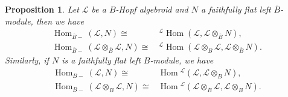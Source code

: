 \documentclass[a4paper,reqno]{amsart}
\DeclareMathOperator{\Hom}{Hom}
\numberwithin{equation}{section}
\theoremstyle{plain}
\newtheorem{prop}[thm]{Proposition}
\theoremstyle{remark}
\numberwithin{equation}{section}
\newcommand{\ot}{\otimes}
\newcommand{\cL}{\mathcal{L}}
\newcommand{\BB}{\overline{B}}
\begin{document}
\begin{prop}\label{skew bijection for colinear maps}
Let $\cL$ be a $B$-Hopf algebroid and $N$ a faithfully flat left $\BB$-module, then we have
\begin{align}
    \Hom_{\BB-}(\cL,N)\cong&\,{}^{\cL}\Hom(\cL,\cL\ot_{\BB}N)\label{equ. correspondence 1},\\
    \Hom_{\BB-}(\cL\ot_{\BB}\cL,N)\cong&\,{}^{\cL}\Hom(\cL\ot_{B}\cL,\cL\ot_{\BB}N)\label{equ. correspondence 2}.
\end{align}
Similarly, if $N$ is a faithfully flat left $B$-module, we have
\begin{align}
    \Hom_{B-}(\cL,N)\cong&\Hom{}^{\cL}(\cL,\cL\ot_{B}N)\label{equ. correspondence 3},\\
    \Hom_{B-}(\cL\ot_{B}\cL,N)\cong&\Hom{}^{\cL}(\cL\ot_{ \BB}\cL,\cL\ot_{B}N)\label{equ. correspondence 4}.
\end{align}
\end{prop}
\end{document}
